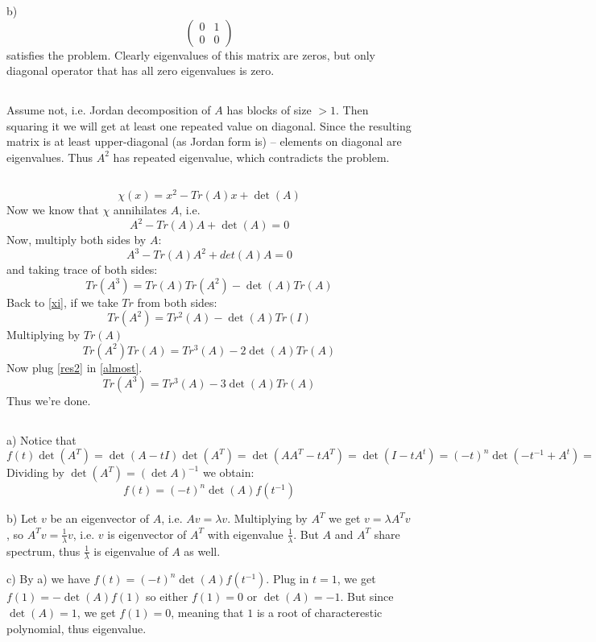 \documentclass{amsart}
\begin{document}
b) 
$$ \begin{pmatrix}
0 & 1 \\
0 & 0
\end{pmatrix}
$$
satisfies the problem. Clearly eigenvalues of this matrix are zeros, but only diagonal operator that has all zero eigenvalues is zero.

\subsection{}
Assume not, i.e. Jordan decomposition of $A$ has blocks of size $>1$. Then squaring it we will get at least one repeated value on diagonal. Since the resulting matrix is at least upper-diagonal (as Jordan form is) -- elements on diagonal are eigenvalues. Thus $A^2$ has repeated eigenvalue, which contradicts the problem.

\subsection{}
$$ \chi (x) = x^2 - Tr(A) x + \det(A)$$
Now we know that $\chi$ annihilates $A$, i.e.
\begin{equation}
    \label{xi}
    A^2 - Tr(A) A + \det(A) = 0
\end{equation}
Now, multiply both sides by $A$:
$$A^3 - Tr(A) A^2 + det(A) A = 0$$
and taking trace of both sides:
\begin{equation}
    \label{almost}
    Tr(A^3) = Tr(A) Tr(A^2) - \det(A) Tr(A)
\end{equation}
Back to \ref{xi}, if we take $Tr$ from both sides:
$$Tr(A^2) = Tr^2(A) - \det(A) Tr(I)$$
Multiplying by $Tr(A)$
\begin{equation}
    \label{res2}
    Tr(A^2) Tr(A) =  Tr^3(A) - 2\det(A) Tr(A)
\end{equation}
Now plug \ref{res2} in \ref{almost}.
$$Tr(A^3) = Tr^3(A) - 3 \det(A) Tr(A)$$
Thus we're done.

\subsection{
}

a) Notice that $f(t) \det(A^T) = \det(A - tI) \det(A^T) = \det(A A^T - t A^T) = \det(I - t A^t) = (-t)^n \det(- t^{-1} + A^t) =  (-t)^n f(t^{-1})$
Dividing by $\det(A^T) = (\det A)^{-1}$ we obtain:
$$ f(t) = (-t)^n \det(A) f(t^{-1})$$

b) Let $v$ be an eigenvector of $A$, i.e. $Av = \lambda v$. Multiplying by $A^T$ we get $v = \lambda A^T v$, so $A^T v = \frac{1}{\lambda} v$, i.e. $v$ is eigenvector of $A^T$ with eigenvalue $\frac{1}{\lambda}$. But $A$ and $A^T$ share spectrum, thus $\frac1{\lambda}$ is eigenvalue of $A$ as well.

c) By a) we have $f(t) = (-t)^n \det(A) f(t^{-1})$. Plug in $t=1$, we get $f(1) = -\det(A) f(1)$ so either $f(1) = 0$ or $\det(A) = -1$. But since $\det(A) = 1$, we get $f(1) = 0$, meaning that $1$ is a root of characterestic polynomial, thus eigenvalue.
\end{document}

